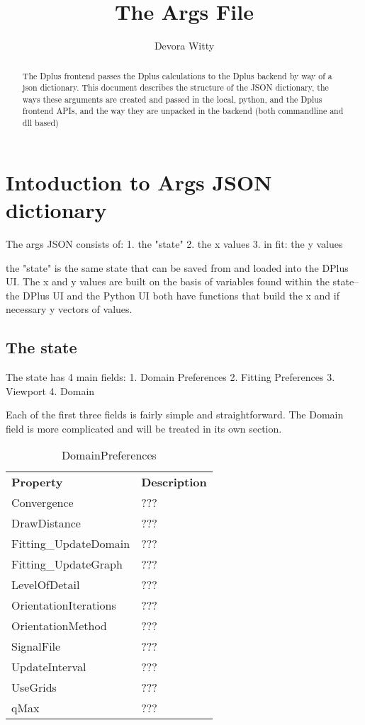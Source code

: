 \documentclass[12pt]{article}
\title{The Args File}
\author{Devora Witty}
\begin{document}
	
\maketitle

\begin{abstract}

The Dplus frontend passes the Dplus calculations to the Dplus backend by way of a json dictionary. This document describes the structure of the JSON dictionary, the ways these arguments are created and passed in the local, python, and the Dplus frontend APIs, and the way they are unpacked in the backend (both commandline and dll based)

\end{abstract}

\section{Intoduction to Args JSON dictionary}


The args JSON consists of:
1. the "state"
2. the x values
3. in fit: the y values

the "state" is the same state that can be saved from and loaded into the DPlus UI. The x and y values are built on the basis of variables found within the state-- the DPlus UI and the Python UI both have functions that build the x and if necessary y vectors of values. 


\subsection{The state}
The state has 4 main fields:
1. Domain Preferences
2. Fitting Preferences
3. Viewport
4. Domain

Each of the first three fields is fairly simple and straightforward. The Domain field is more complicated and will be treated in its own section.

\begin{center}
\begin{table}[]
	\centering
	\caption{DomainPreferences}
	\begin{tabular}{ll}
		\textbf{Property}     & \textbf{Description} \\
		Convergence           & ???                  \\
		DrawDistance          & ???                  \\
		Fitting\_UpdateDomain & ???                  \\
		Fitting\_UpdateGraph  & ???                  \\
		LevelOfDetail         & ???                  \\
		OrientationIterations & ???                 \\
		OrientationMethod    & ??? \\
		SignalFile & ??? \\
		UpdateInterval & ???\\
		UseGrids & ???\\
		qMax & ???
	\end{tabular}
\end{table}
\end{center}                             
\end{document}
